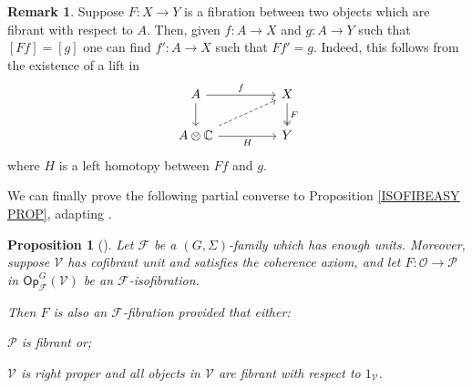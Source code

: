 \documentclass[a4paper,10pt
,draft
]{article}%
\numberwithin{equation}{section}
\numberwithin{figure}{section}
\newtheorem{proposition}[equation]{Proposition}%
\theoremstyle{definition} %
\newtheorem{remark}[equation]{Remark}%
\newcommand{\Op}{\mathsf{Op}}%
\newcommand{\F}{\ensuremath{\mathcal F}}
\newcommand{\V}{\ensuremath{\mathcal V}}
\renewcommand{\O}{\ensuremath{\mathcal O}}
\renewcommand{\P}{\ensuremath{\mathcal P}}
\newcommand{\1}{\ensuremath{\mathbbm 1}}%
\begin{document}
\begin{remark}\label{RELFIBLIFT REM}
	Suppose $F\colon X \to Y$ is a fibration between two objects
	which are fibrant with respect to $A$.
	Then, given 
	$f\colon A \to X$ and $g \colon A \to Y$
	such that
	$[Ff] = [g]$
	one can find 
	$f'\colon A \to X$ such that $Ff' =g$.
	Indeed, this follows from the existence of a 
	lift in 
\begin{equation}
\begin{tikzcd}[column sep = 45pt]
	A \ar{d} \ar{r}{f}
&
	X \ar[twoheadrightarrow]{d}{F}
\\
	A \otimes \mathbb{C} \ar{r}[swap]{H} \ar[dashed]{ru}
&
	Y
\end{tikzcd}
\end{equation}
	where $H$ is a left homotopy between $Ff$ and $g$.
\end{remark}


We can finally prove the following partial converse to Proposition \ref{ISOFIBEASY PROP}, 
adapting \cite[Prop. 2.5]{Ber07b}.


\begin{proposition}[{\cite[Prop. 2.5]{Ber07b}}]
	\label{ISOFIBHARD PROP}
	Let $\F$ be a $(G,\Sigma)$-family which has enough units.
	Moreover, suppose $\V$ has cofibrant unit
	and satisfies the coherence axiom,
	and let $F: \O \to \P$ in $\Op^G_\F(\V)$
	be an $\F$-isofibration.
	
	Then $F$ is also an $\F$-fibration
	provided that either:
	\begin{enumerate*}[label = (\roman*)]
		\item $\P$ is fibrant or;
		\item $\V$ is right proper and
		all objects in $\V$ are fibrant with respect to $1_{\V}$.
	\end{enumerate*}
\end{proposition}
\end{document}
